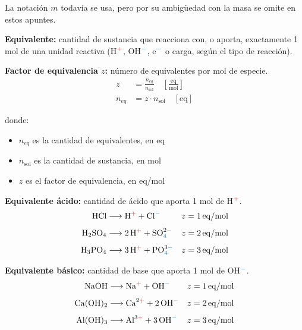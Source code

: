 \begin{notafija}
La notación \(m\) todavía se usa, pero por su ambigüedad con la masa se omite 
en estos apuntes.
\end{notafija}

\textbf{Equivalente:} cantidad de sustancia que reacciona con, o aporta, 
exactamente 1 mol de una unidad reactiva (H$^{\color{catred}+}$, 
OH$^{\color{anblue}-}$, e$^{\color{anblue}-}$ o carga, según el tipo de reacción).

\textbf{Factor de equivalencia $z$:} número de equivalentes por mol de especie.
\begin{align*}
    z &= \frac{n_{eq}}{n_{\mathrm{sol}}}
    \quad \left[\frac{\mathrm{eq}}{\mathrm{mol}}\right] \\[4pt]
    n_{eq} &= z \cdot n_{\mathrm{sol}}
    \quad [\mathrm{eq}]
\end{align*}

donde:
\begin{itemize}
    \item \(n_{eq}\) es la cantidad de equivalentes, en eq
    \item \(n_{\mathrm{sol}}\) es la cantidad de sustancia, en mol
    \item \(z\) es el factor de equivalencia, en eq/mol
\end{itemize}

\textbf{Equivalente ácido:} cantidad de ácido que aporta 1 mol de H$^{\color{catred}+}$.
\begin{align*}
    \ce{HCl} &\longrightarrow \ce{H}^{\color{catred}+} + \ce{Cl}^{\color{anblue}-} 
    & z &= 1\,\mathrm{eq/mol} \\[4pt]
    \ce{H2SO4} &\longrightarrow 2\,\ce{H}^{\color{catred}+} + \ce{SO4}^{2\color{anblue}-} 
    & z &= 2\,\mathrm{eq/mol} \\[4pt]
    \ce{H3PO4} &\longrightarrow 3\,\ce{H}^{\color{catred}+} + \ce{PO4}^{3\color{anblue}-} 
    & z &= 3\,\mathrm{eq/mol}
\end{align*}

\textbf{Equivalente básico:} cantidad de base que aporta 1 mol de 
OH$^{\color{anblue}-}$.
\begin{align*}
    \ce{NaOH} &\longrightarrow \ce{Na}^{\color{catred}+} + \ce{OH}^{\color{anblue}-} 
    & z &= 1\,\mathrm{eq/mol} \\[4pt]
    \ce{Ca(OH)2} &\longrightarrow \ce{Ca}^{2\color{catred}+} + 2\,\ce{OH}^{\color{anblue}-} 
    & z &= 2\,\mathrm{eq/mol} \\[4pt]
    \ce{Al(OH)3} &\longrightarrow \ce{Al}^{3\color{catred}+} + 3\,\ce{OH}^{\color{anblue}-} 
    & z &= 3\,\mathrm{eq/mol}
\end{align*}

